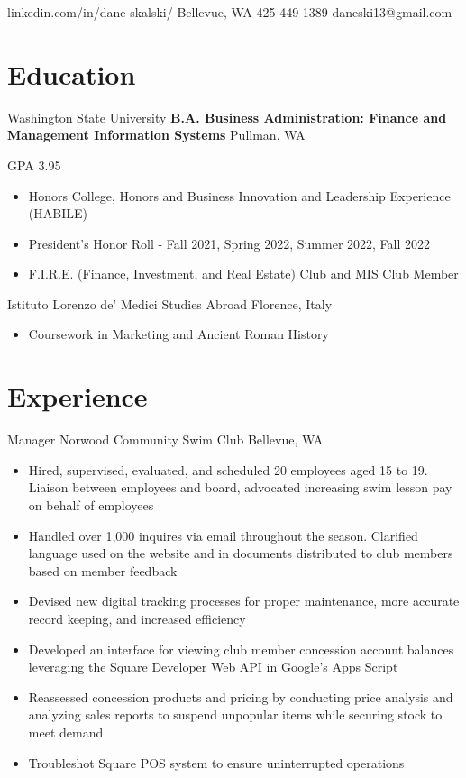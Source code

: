\documentclass[10pt]{resume}
\begin{document}
{linkedin.com/in/dane-skalski/}
{Bellevue, WA}
{425-449-1389}
{daneski13@gmail.com}

\section{Education}
{Washington State University}
{\textbf{B.A. Business Administration: Finance and Management Information Systems}}
{Pullman, WA}
{
    GPA 3.95
    \begin{itemize}
        \item Honors College, Honors and Business Innovation and Leadership Experience (HABILE)
        \item President's Honor Roll - Fall 2021, Spring 2022, Summer 2022, Fall 2022
        \item F.I.R.E. (Finance, Investment, and Real Estate) Club and MIS Club Member
    \end{itemize}
}

{Istituto Lorenzo de' Medici}
{Studies Abroad}
{Florence, Italy}
{
    \begin{itemize}
        \item Coursework in Marketing and Ancient Roman History
    \end{itemize}
}

\section{Experience}
{Manager}
{Norwood Community Swim Club}
{Bellevue, WA}
{
    \begin{itemize}
        \item Hired, supervised, evaluated, and scheduled 20 employees aged 15 to 19. Liaison between employees and board, advocated increasing swim lesson pay on behalf of employees

        \item Handled over 1,000 inquires via email throughout the season. Clarified language used on the website and in documents distributed to club members based on member feedback

        \item Devised new digital tracking processes for proper maintenance, more accurate record keeping, and increased efficiency

        \item Developed an interface for viewing club member concession account balances leveraging the Square Developer Web API in Google's Apps Script

        \item Reassessed concession products and pricing by conducting price analysis and analyzing sales reports to suspend unpopular items while securing stock to meet demand

        \item Troubleshot Square POS system to ensure uninterrupted operations
    \end{itemize}
}
\end{document}
